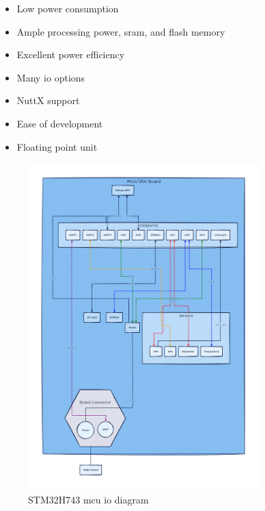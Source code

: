 \begin{itemize}
    \item Low power consumption
    \item Ample processing power, \gls{sram}, and flash memory
    \item Excellent power efficiency
    \item Many \gls{io} options
    \item NuttX support
    \item Ease of development
    \item Floating point unit
\end{itemize}

\begin{figure}[H]
    \centering
    \includegraphics[width=0.8\textwidth]{assets/diagrams/mcu_board.png}
    \caption{STM32H743 \gls{mcu} \gls{io} diagram}
    \label{fig:mcu-diagram}
\end{figure}

